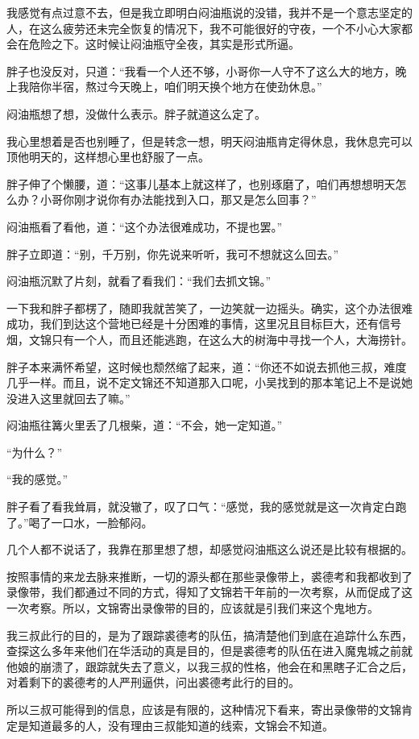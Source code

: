 我感觉有点过意不去，但是我立即明白闷油瓶说的没错，我并不是一个意志坚定的人，在这么疲劳还未完全恢复的情况下，我不可能很好的守夜，一个不小心大家都会在危险之下。这时候让闷油瓶守全夜，其实是形式所逼。

胖子也没反对，只道：“我看一个人还不够，小哥你一人守不了这么大的地方，晚上我陪你半宿，熬过今天晚上，咱们明天换个地方在使劲休息。”

闷油瓶想了想，没做什么表示。胖子就道这么定了。

我心里想着是否也别睡了，但是转念一想，明天闷油瓶肯定得休息，我休息完可以顶他明天的，这样想心里也舒服了一点。

胖子伸了个懒腰，道：“这事儿基本上就这样了，也别琢磨了，咱们再想想明天怎么办？小哥你刚才说你有办法能找到入口，那又是怎么回事？”

闷油瓶看了看他，道：“这个办法很难成功，不提也罢。”

胖子立即道：“别，千万别，你先说来听听，我可不想就这么回去。”

闷油瓶沉默了片刻，就看了看我们：“我们去抓文锦。”

一下我和胖子都楞了，随即我就苦笑了，一边笑就一边摇头。确实，这个办法很难成功，我们到达这个营地已经是十分困难的事情，这里况且目标巨大，还有信号烟，文锦只有一个人，而且还能逃跑，在这么大的树海中寻找一个人，大海捞针。

胖子本来满怀希望，这时候也颓然缩了起来，道：“你还不如说去抓他三叔，难度几乎一样。而且，说不定文锦还不知道那入口呢，小吴找到的那本笔记上不是说她没进入这里就回去了嘛。”

闷油瓶往篝火里丢了几根柴，道：“不会，她一定知道。”

“为什么？”

“我的感觉。”

胖子看了看我耸肩，就没辙了，叹了口气：“感觉，我的感觉就是这一次肯定白跑了。”喝了一口水，一脸郁闷。

几个人都不说话了，我靠在那里想了想，却感觉闷油瓶这么说还是比较有根据的。

按照事情的来龙去脉来推断，一切的源头都在那些录像带上，裘德考和我都收到了录像带，我们都通过不同的方式，得知了文锦若干年前的一次考察，从而促成了这一次考察。所以，文锦寄出录像带的目的，应该就是引我们来这个鬼地方。

我三叔此行的目的，是为了跟踪裘德考的队伍，搞清楚他们到底在追踪什么东西，查探这么多年来他们在华活动的真是目的，但是裘德考的队伍在进入魔鬼城之前就他娘的崩溃了，跟踪就失去了意义，以我三叔的性格，他会在和黑瞎子汇合之后，对着剩下的裘德考的人严刑逼供，问出裘德考此行的目的。

所以三叔可能得到的信息，应该是有限的，这种情况下看来，寄出录像带的文锦肯定是知道最多的人，没有理由三叔能知道的线索，文锦会不知道。

